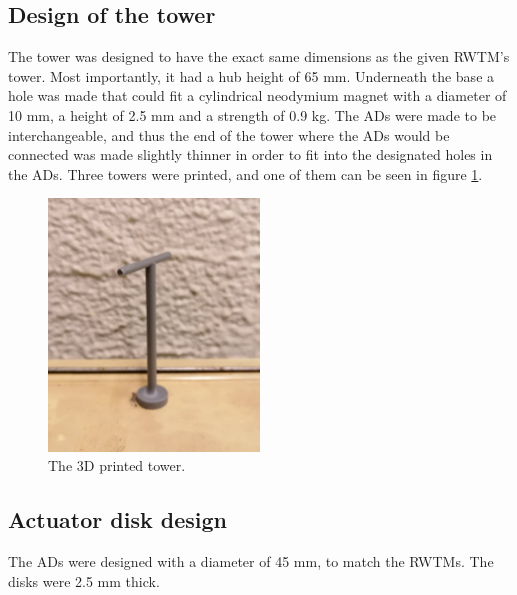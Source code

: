 \subsection{Design of the tower}
The tower was designed to have the exact same dimensions as the given \gls{RWTM}'s tower. Most importantly, it had a hub height of 65 \si{\mm}. Underneath the base a hole was made that could fit a cylindrical neodymium magnet with a diameter of 10 \si{\mm}, a height of 2.5 \si{\mm} and a strength of 0.9 \si{\kg}. The \gls{AD}s were made to be interchangeable, and thus the end of the tower where the \gls{AD}s would be connected was made slightly thinner in order to fit into the designated holes in the \gls{AD}s. Three towers were printed, and one of them can be seen in figure \ref{fig:towers}.

\begin{figure}
    \centering
    \includegraphics[width=0.5\textwidth]{0_Images/tower.jpg}    
    \caption{The 3D printed tower.}
    \label{fig:towers}
\end{figure}


\subsection{Actuator disk design}
The \gls{AD}s were designed with a diameter of 45 mm, to match the \gls{RWTM}s. The disks were 2.5 \si{\mm} thick.

